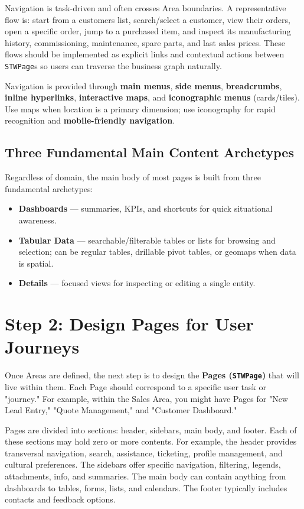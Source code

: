 Navigation is task-driven and often crosses Area boundaries. A representative flow is:
start from a customers list, search/select a customer, view their orders, open a specific order, jump to a purchased item, and inspect its manufacturing history, commissioning, maintenance, spare parts, and last sales prices. These flows should be implemented as explicit links and contextual actions between \texttt{STWPage}s so users can traverse the business graph naturally.

Navigation is provided through \textbf{main menus}, \textbf{side menus}, \textbf{breadcrumbs}, \textbf{inline hyperlinks}, \textbf{interactive maps}, and \textbf{iconographic menus} (cards/tiles). Use maps when location is a primary dimension; use iconography for rapid recognition and \textbf{mobile-friendly navigation}.

\subsection{Three Fundamental Main Content Archetypes}
Regardless of domain, the main body of most pages is built from three fundamental archetypes:
\begin{itemize}
  \item \textbf{Dashboards} — summaries, KPIs, and shortcuts for quick situational awareness.
  \item \textbf{Tabular Data} — searchable/filterable tables or lists for browsing and selection; can be regular tables, drillable pivot tables, or geomaps when data is spatial.
  \item \textbf{Details} — focused views for inspecting or editing a single entity.
\end{itemize}

\section{Step 2: Design Pages for User Journeys}
\label{sec:step2-pages}

Once Areas are defined, the next step is to design the \textbf{Pages (\texttt{STWPage})} that will live within them. Each Page should correspond to a specific user task or "journey." For example, within the Sales Area, you might have Pages for "New Lead Entry," "Quote Management," and "Customer Dashboard."

Pages are divided into sections: header, sidebars, main body, and footer. Each of these sections may hold zero or more contents. For example, the header provides transversal navigation, search, assistance, ticketing, profile management, and cultural preferences. The sidebars offer specific navigation, filtering, legends, attachments, info, and summaries. The main body can contain anything from dashboards to tables, forms, lists, and calendars. The footer typically includes contacts and feedback options.

